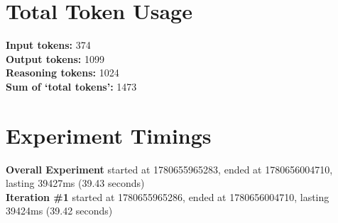 \documentclass{article}
\begin{document}
\section*{Total Token Usage}
\textbf{Input tokens: }374
\\\textbf{Output tokens: }1099
\\\textbf{Reasoning tokens: }1024
\\\textbf{Sum of `total tokens': }1473
\section*{Experiment Timings}
\textbf{Overall Experiment} started at 1780655965283, ended at 1780656004710, lasting 39427ms (39.43 seconds)
\\\textbf{Iteration \#1} started at 1780655965286, ended at 1780656004710, lasting 39424ms (39.42 seconds)
\end{document}

